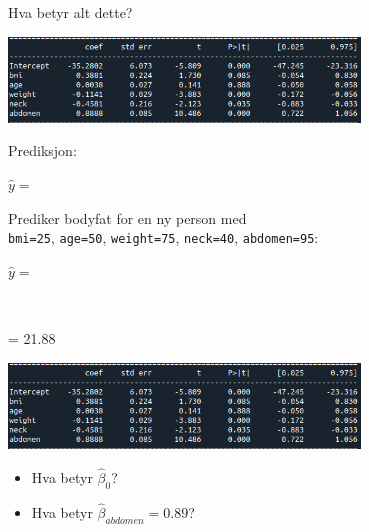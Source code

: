 \documentclass[10pt,ignorenonframetext,]{beamer}
\begin{document}
\begin{frame}[fragile]

\begin{block}{Hva betyr alt dette?}

\vspace{2mm}

\includegraphics[width=0.7\textwidth,height=\textheight]{ols_result_all_coefs.png}

\vspace{2mm}

Prediksjon:

\vspace{2mm}

\(\hat{y}=\)

\vspace{10mm}

Prediker bodyfat for en ny person med\\
\texttt{bmi=25}, \texttt{age=50}, \texttt{weight=75}, \texttt{neck=40},
\texttt{abdomen=95}:

\vspace{2mm}

\(\hat{y}=\)

\(~\)

= 21.88

\end{block}

\end{frame}

\begin{frame}

\includegraphics[width=0.7\textwidth,height=\textheight]{ols_result_all_coefs.png}

\vspace{2mm}

\begin{itemize}
\item
  Hva betyr \(\hat\beta_0\)?
\item
  Hva betyr \(\hat\beta_{abdomen}=0.89\)?
\end{itemize}

\vspace{20mm}

\end{frame}
\end{document}
